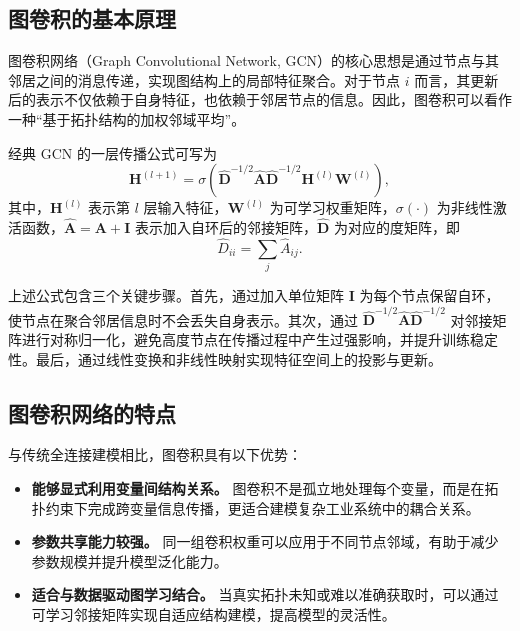 \subsection{图卷积的基本原理}

图卷积网络（Graph Convolutional Network, GCN）的核心思想是通过节点与其邻居之间的消息传递，实现图结构上的局部特征聚合。对于节点 $i$ 而言，其更新后的表示不仅依赖于自身特征，也依赖于邻居节点的信息。因此，图卷积可以看作一种``基于拓扑结构的加权邻域平均''。

经典 GCN 的一层传播公式可写为
\begin{equation}
    \mathbf{H}^{(l+1)} =
    \sigma\!\left(
        \hat{\mathbf{D}}^{-1/2}
        \hat{\mathbf{A}}
        \hat{\mathbf{D}}^{-1/2}
        \mathbf{H}^{(l)}
        \mathbf{W}^{(l)}
    \right),
\end{equation}
其中，$\mathbf{H}^{(l)}$ 表示第 $l$ 层输入特征，$\mathbf{W}^{(l)}$ 为可学习权重矩阵，$\sigma(\cdot)$ 为非线性激活函数，$\hat{\mathbf{A}} = \mathbf{A} + \mathbf{I}$ 表示加入自环后的邻接矩阵，$\hat{\mathbf{D}}$ 为对应的度矩阵，即
\begin{equation}
    \hat{D}_{ii} = \sum_j \hat{A}_{ij}.
\end{equation}

上述公式包含三个关键步骤。首先，通过加入单位矩阵 $\mathbf{I}$ 为每个节点保留自环，使节点在聚合邻居信息时不会丢失自身表示。其次，通过 $\hat{\mathbf{D}}^{-1/2}\hat{\mathbf{A}}\hat{\mathbf{D}}^{-1/2}$ 对邻接矩阵进行对称归一化，避免高度节点在传播过程中产生过强影响，并提升训练稳定性。最后，通过线性变换和非线性映射实现特征空间上的投影与更新。

\subsection{图卷积网络的特点}

与传统全连接建模相比，图卷积具有以下优势：

\begin{itemize}
    \item \textbf{能够显式利用变量间结构关系。} 图卷积不是孤立地处理每个变量，而是在拓扑约束下完成跨变量信息传播，更适合建模复杂工业系统中的耦合关系。
    \item \textbf{参数共享能力较强。} 同一组卷积权重可以应用于不同节点邻域，有助于减少参数规模并提升模型泛化能力。
    \item \textbf{适合与数据驱动图学习结合。} 当真实拓扑未知或难以准确获取时，可以通过可学习邻接矩阵实现自适应结构建模，提高模型的灵活性。
\end{itemize}

